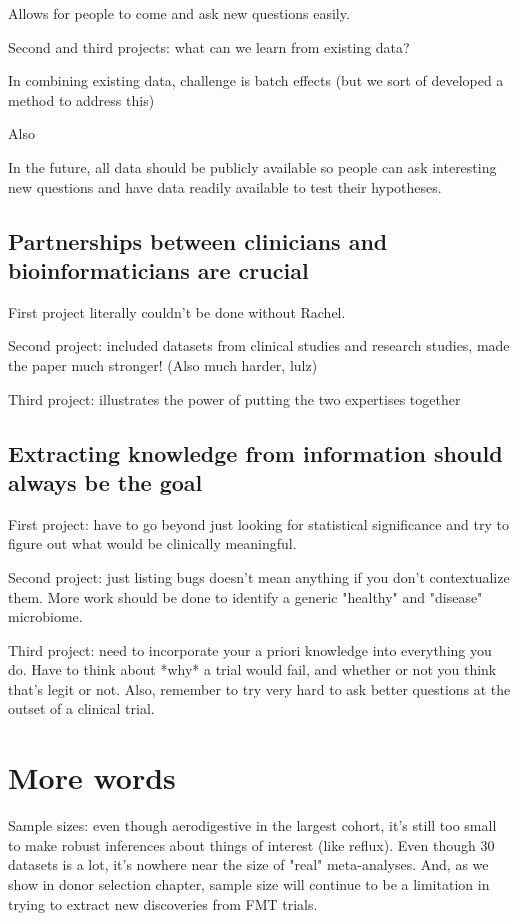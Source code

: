 Allows for people to come and ask new questions easily.

Second and third projects: what can we learn from existing data?

In combining existing data, challenge is batch effects (but we sort of developed a method to address this)

Also

In the future, all data should be publicly available so people can ask interesting new questions and have data readily available to test their hypotheses.

\subsection{Partnerships between clinicians and bioinformaticians are crucial}

First project literally couldn't be done without Rachel.

Second project: included datasets from clinical studies and research studies, made the paper much stronger! (Also much harder, lulz)

Third project: illustrates the power of putting the two expertises together

\subsection{Extracting knowledge from information should always be the goal}

First project: have to go beyond just looking for statistical significance and try to figure out what would be clinically meaningful.

Second project: just listing bugs doesn't mean anything if you don't contextualize them. More work should be done to identify a generic "healthy" and "disease" microbiome.

Third project: need to incorporate your a priori knowledge into everything you do. Have to think about *why* a trial would fail, and whether or not you think that's legit or not. Also, remember to try very hard to ask better questions at the outset of a clinical trial.



\section{More words}

Sample sizes: even though aerodigestive in the largest cohort, it's still too small to make robust inferences about things of interest (like reflux). Even though 30 datasets is a lot, it's nowhere near the size of "real" meta-analyses. And, as we show in donor selection chapter, sample size will continue to be a limitation in trying to extract new discoveries from FMT trials.

